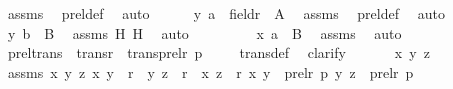\begin{isabellebody}
\ assms{}\ \isamarkupfalse%
\ prel{\isacharunderscore}{\kern0pt}def\ \isamarkupfalse%
\ auto\isanewline
\ \ \ \ \isamarkupfalse%
\ {\isachardoublequoteopen}{\isacharless}{\kern0pt}y{\isacharcomma}{\kern0pt}\ a{\isachargreater}{\kern0pt}\ {\isasymin}\ field{\isacharparenleft}{\kern0pt}r{\isacharparenright}{\kern0pt}\ {\isasymtimes}\ A{\isachardoublequoteclose}\ \isamarkupfalse%
\ assms{}\ \isamarkupfalse%
\ prel{\isacharunderscore}{\kern0pt}def\ \isamarkupfalse%
\ auto\isanewline
\ \ \ \ \isamarkupfalse%
\ \isamarkupfalse%
\ {\isachardoublequoteopen}{\isasymlangle}y{\isacharcomma}{\kern0pt}\ b{\isasymrangle}\ {\isasymin}\ B{\isachardoublequoteclose}\ \isamarkupfalse%
\ assms{}\ H{}\ H{}\ \isamarkupfalse%
\ auto\ \isanewline
\ \ \isamarkupfalse%
\isanewline
\ \ \isamarkupfalse%
\ \isamarkupfalse%
\ {\isachardoublequoteopen}{\isacharless}{\kern0pt}x{\isacharcomma}{\kern0pt}\ a{\isachargreater}{\kern0pt}\ {\isasymin}\ B{\isachardoublequoteclose}\ \isamarkupfalse%
\ assms\ \isamarkupfalse%
\ auto\ \isanewline
{}\isamarkupfalse%
%
\endisatagproof
{\isafoldproof}%
%
\isadelimproof
\ \isanewline
%
\endisadelimproof
\isanewline
{}\isamarkupfalse%
\ prel{\isacharunderscore}{\kern0pt}trans\ {\isacharcolon}{\kern0pt}\ {\isachardoublequoteopen}trans{\isacharparenleft}{\kern0pt}r{\isacharparenright}{\kern0pt}\ {\isasymLongrightarrow}\ trans{\isacharparenleft}{\kern0pt}prel{\isacharparenleft}{\kern0pt}r{\isacharcomma}{\kern0pt}\ p{\isacharparenright}{\kern0pt}{\isacharparenright}{\kern0pt}{\isachardoublequoteclose}\ \isanewline
%
\isadelimproof
\ \ %
\endisadelimproof
%
\isatagproof
{}\isamarkupfalse%
\ trans{\isacharunderscore}{\kern0pt}def\ \isamarkupfalse%
\ clarify\isanewline
{}\isamarkupfalse%
\ {\isacharminus}{\kern0pt}\ \isanewline
\ \ \isamarkupfalse%
\ x\ y\ z\ \isamarkupfalse%
\ assms{\isacharcolon}{\kern0pt}\ {\isachardoublequoteopen}{\isasymforall}x\ y\ z{\isachardot}{\kern0pt}\ {\isasymlangle}x{\isacharcomma}{\kern0pt}\ y{\isasymrangle}\ {\isasymin}\ r\ {\isasymlongrightarrow}\ {\isasymlangle}y{\isacharcomma}{\kern0pt}\ z{\isasymrangle}\ {\isasymin}\ r\ {\isasymlongrightarrow}\ {\isasymlangle}x{\isacharcomma}{\kern0pt}\ z{\isasymrangle}\ {\isasymin}\ r{\isachardoublequoteclose}\ {\isachardoublequoteopen}{\isasymlangle}x{\isacharcomma}{\kern0pt}\ y{\isasymrangle}\ {\isasymin}\ prel{\isacharparenleft}{\kern0pt}r{\isacharcomma}{\kern0pt}\ p{\isacharparenright}{\kern0pt}{\isachardoublequoteclose}\ {\isachardoublequoteopen}{\isasymlangle}y{\isacharcomma}{\kern0pt}\ z{\isasymrangle}\ {\isasymin}\ prel{\isacharparenleft}{\kern0pt}r{\isacharcomma}{\kern0pt}\ p{\isacharparenright}{\kern0pt}{\isachardoublequoteclose}\isanewline

\end{isabellebody}
